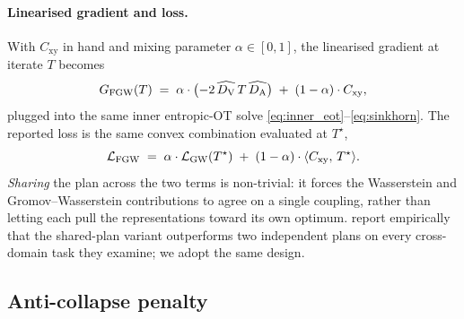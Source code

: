 \paragraph{Linearised gradient and loss.}
With $C_{\mathrm{xy}}$ in hand and mixing parameter
$\alpha \in [0,1]$, the linearised gradient at iterate $T$ becomes
\begin{equation}
  G_{\mathrm{FGW}}(T)
  \;=\;
  \alpha \cdot \bigl(-2\, \widehat{D_{\mathrm{V}}} \, T \, \widehat{D_{\mathrm{A}}}\bigr)
  \;+\;
  (1 - \alpha) \cdot C_{\mathrm{xy}},
  \label{eq:fgw_gradient}
\end{equation}
plugged into the same inner entropic-OT solve
\eqref{eq:inner_eot}--\eqref{eq:sinkhorn}. The reported loss is
the same convex combination evaluated at $T^{\star}$,
\begin{equation}
  \mathcal{L}_{\mathrm{FGW}}
  \;=\;
  \alpha \cdot \mathcal{L}_{\mathrm{GW}}(T^{\star})
  \;+\;
  (1 - \alpha) \cdot \langle C_{\mathrm{xy}},\, T^{\star} \rangle.
  \label{eq:fgw_value}
\end{equation}
\textit{Sharing} the plan across the two terms is non-trivial: it
forces the Wasserstein and Gromov--Wasserstein contributions to
agree on a single coupling, rather than letting each pull the
representations toward its own optimum. \citet{chen_2020_graph}
report empirically that the shared-plan variant outperforms two
independent plans on every cross-domain task they examine; we
adopt the same design.

\subsection{Anti-collapse penalty}
\label{sec:methodology:anticollapse}

